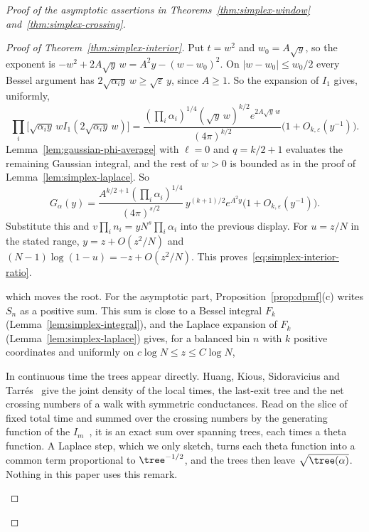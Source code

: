 \begin{proof}[Proof of the asymptotic assertions in
Theorems~\ref{thm:simplex-window} and~\ref{thm:simplex-crossing}]
\begin{proof}[Proof of Theorem~\ref{thm:simplex-interior}]
Put $t=w^2$ and $w_0=A\sqrt y$, so the exponent is
$-w^2+2A\sqrt y\,w=A^2y-(w-w_0)^2$. On $|w-w_0|\le w_0/2$ every Bessel argument
has $2\sqrt{\alpha_iy}\,w\ge\sqrt\varepsilon\,y$, since $A\ge1$. So the expansion
of $I_1$ gives, uniformly,
\[
\prod_i\bigl[\sqrt{\alpha_iy}\,wI_1(2\sqrt{\alpha_iy}\,w)\bigr]
=\frac{(\prod_i\alpha_i)^{1/4}(\sqrt y\,w)^{k/2}e^{2A\sqrt y\,w}}{(4\pi)^{k/2}}
\bigl(1+O_{k,\varepsilon}(y^{-1})\bigr).
\]
Lemma~\ref{lem:gaussian-phi-average} with $\ell=0$ and $q=k/2+1$ evaluates the
remaining Gaussian integral, and the rest of $w>0$ is bounded as in the proof of
Lemma~\ref{lem:simplex-laplace}. So
\[
G_\alpha(y)=\frac{A^{k/2+1}(\prod_i\alpha_i)^{1/4}}{(4\pi)^{s/2}}\,
y^{(k+1)/2}e^{A^2y}\bigl(1+O_{k,\varepsilon}(y^{-1})\bigr).
\]
Substitute this and $v\prod_in_i=yN^s\prod_i\alpha_i$ into the previous display.
For $u=z/N$ in the stated range, $y=z+O(z^2/N)$ and
$(N-1)\log(1-u)=-z+O(z^2/N)$. This proves~\eqref{eq:simplex-interior-ratio}.


which moves the root. For the asymptotic part, Proposition~\ref{prop:dpmf}(c)
writes $S_n$ as a positive sum. This sum is close to a Bessel integral $F_k$
(Lemma~\ref{lem:simplex-integral}), and the Laplace expansion of $F_k$
(Lemma~\ref{lem:simplex-laplace}) gives, for a balanced bin $n$ with $k$
positive coordinates and uniformly on $c\log N\le z\le C\log N$,

\begin{remark}\label{rem:last-exit-trees}
In continuous time the trees appear directly. Huang, Kious, Sidoravicius and
Tarr\'es~\cite[Theorem~1]{huang2018} give the joint density of the local times,
the last-exit tree and the net crossing numbers of a walk with symmetric
conductances. Read on the slice of fixed total time and summed over the crossing
numbers by the generating function of the $I_m$~\cite[Eq.~10.35.1]{dlmf}, it is
an exact sum over spanning trees, each times a theta function. A Laplace step,
which we only sketch, turns each theta function into a common term proportional
to $\tree^{-1/2}$, and the trees then leave $\sqrt{\tree(\alpha)}$. Nothing in
this paper uses this remark.
\end{remark}


\end{proof}
\end{proof}
